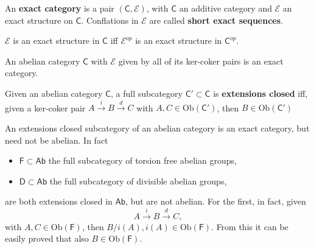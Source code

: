 \begin{defn}
	An \textbf{exact category} is a pair $\left(\mathsf{C}, \mathcal{E}\right)$, with $\mathsf{C}$ an additive category and $\mathcal{E}$ an exact structure on $\mathsf{C}$.
	Conflations in $\mathcal{E}$ are called \textbf{short exact sequences}.
\end{defn}

\begin{rem}
	$\mathcal{E}$ is an exact structure in $\mathsf{C}$ iff $\mathcal{E}^{op}$ is an exact structure in $\mathsf{C}^{op}$.
\end{rem}

\begin{rem}
	An abelian category $\mathsf{C}$ with $\mathcal{E}$ given by all of its ker-coker pairs is an exact category.
\end{rem}

\begin{defn}
	Given an abelian category $\mathsf{C}$, a full subcategory $\mathsf{C}' \subset \mathsf{C}$ is \textbf{extensions closed} iff, given a ker-coker pair
	$A \xrightarrow{i} B \xrightarrow{d} C$ with $A, C \in \mathrm{Ob} \left(\mathsf{C}'\right)$, then $B \in \mathrm{Ob} \left(\mathsf{C}'\right)$
\end{defn}

\begin{rem}
	An extensions closed subcategory of an abelian category is an exact category, but need not be abelian.
	In fact
	\begin{itemize}
		\item $\mathsf{F} \subset \mathsf{Ab}$ the full subcategory of torsion free abelian groups,
		\item $\mathsf{D} \subset \mathsf{Ab}$ the full subcategory of divisible abelian groups,
	\end{itemize}
	are both extensions closed in $\mathsf{Ab}$, but are not abelian.
	For the first, in fact, given
	\begin{equation}
	A \xrightarrow{i} B \xrightarrow{d} C
	,\end{equation} 
	with $A, C \in \mathrm{Ob} \left(\mathsf{F}\right)$, then $B/i(A), i(A) \in \mathrm{Ob} \left(\mathsf{F}\right)$.
	From this it can be easily proved that also $B \in \mathrm{Ob} \left(\mathsf{F}\right)$.
\end{rem}

